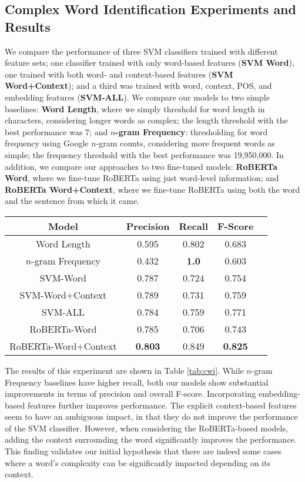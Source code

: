 \documentclass[thesis.tex]{subfiles}
\begin{document}
\subsection{Complex Word Identification Experiments and Results}

We compare the performance of three SVM classifiers trained with different feature sets; one classifier trained with only word-based features (\textbf{SVM Word}), one trained with both word- and context-based features (\textbf{SVM Word+Context}); and a third was trained with word, context, POS, and embedding features (\textbf{SVM-ALL}). We compare our models to two simple baselines: \textbf{Word Length}, where we simply threshold for word length in characters, considering longer words as complex; the length threshold with the best performance was 7; and \textbf{$n$-gram Frequency}: thresholding for word frequency using Google $n$-gram counts, considering more frequent words as simple; the frequency threshold with the best performance was 19,950,000. In addition, we compare our approaches to two fine-tuned models: \textbf{RoBERTa Word}, where we fine-tune RoBERTa using just word-level information; and \textbf{RoBERTa Word+Context}, where we fine-tune RoBERTa using both the word and the sentence from which it came.

\begin{table*}
	\small
	\centering
	\begin{tabular}{|c||c|c|c|c|}
		\hline \bf Model & \bf Precision & \bf Recall & \bf F-Score \\ \hline
Word Length & 0.595 & 0.802 & 0.683 \\
$n$-gram Frequency & 0.432 & \textbf{1.0} & 0.603 \\ \hline
SVM-Word & 0.787 & 0.724 & 0.754 \\
SVM-Word+Context & 0.789 & 0.731 & 0.759 \\ 
SVM-ALL & 0.784 & 0.759 & 0.771 \\ \hline 
RoBERTa-Word & 0.785 & 0.706 & 0.743 \\ 
RoBERTa-Word+Context & \textbf{0.803} & 0.849 & \textbf{0.825} \\ \hline
	\end{tabular}
	\caption{Cross-validation performance for three complex word identification classifiers, along with comparisons to three baselines. Scores are calculated using \textbf{unique} words in our training data.}
	\label{tab:cwi}
\end{table*}

The results of this experiment are shown in Table \ref{tab:cwi}. While $n$-gram Frequency baselines have higher recall, both our models show substantial improvements in terms of precision and overall F-score. Incorporating embedding-based features further improves performance. The explicit context-based features seem to have an ambiguous impact, in that they do not improve the performance of the SVM classifier. However, when considering the RoBERTa-based models, adding the context surrounding the word significantly improves the performance. This finding validates our initial hypothesis that there are indeed some cases where a word's complexity can be significantly impacted depending on its context.
\end{document}
